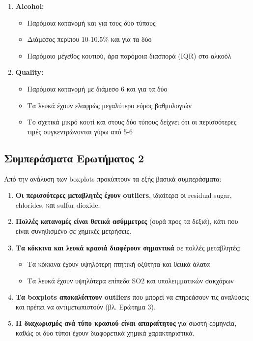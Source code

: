 \documentclass[12pt,a4paper]{article}
\begin{document}
\begin{enumerate}
    \item \textbf{Alcohol:}
    \begin{itemize}
        \item Παρόμοια κατανομή και για τους δύο τύπους
        \item Διάμεσος περίπου 10-10.5\% και για τα δύο
        \item Παρόμοιο μέγεθος κουτιού, άρα παρόμοια διασπορά (IQR) στο αλκοόλ
    \end{itemize}
    
    \item \textbf{Quality:}
    \begin{itemize}
        \item Παρόμοια κατανομή με διάμεσο 6 και για τα δύο
        \item Τα λευκά έχουν ελαφρώς μεγαλύτερο εύρος βαθμολογιών
        \item Το σχετικά μικρό κουτί και στους δύο τύπους δείχνει ότι οι περισσότερες τιμές συγκεντρώνονται γύρω από 5-6
    \end{itemize}
\end{enumerate}

\subsection{Συμπεράσματα Ερωτήματος 2}

Από την ανάλυση των boxplots προκύπτουν τα εξής βασικά συμπεράσματα:

\begin{enumerate}
    \item \textbf{Οι περισσότερες μεταβλητές έχουν outliers}, ιδιαίτερα οι residual sugar, chlorides, και sulfur dioxide.
    
    \item \textbf{Πολλές κατανομές είναι θετικά ασύμμετρες} (ουρά προς τα δεξιά), κάτι που είναι συνηθισμένο σε χημικές μετρήσεις.
    
    \item \textbf{Τα κόκκινα και λευκά κρασιά διαφέρουν σημαντικά} σε πολλές μεταβλητές:
    \begin{itemize}
        \item Τα κόκκινα έχουν υψηλότερη πτητική οξύτητα και θειικά άλατα
        \item Τα λευκά έχουν υψηλότερα επίπεδα SO2 και υπολειμματικών σακχάρων
    \end{itemize}
    
    \item \textbf{Τα boxplots αποκαλύπτουν outliers} που μπορεί να επηρεάσουν τις αναλύσεις και πρέπει να αντιμετωπιστούν (βλ. Ερώτημα 3).
    
    \item \textbf{Η διαχωρισμός ανά τύπο κρασιού είναι απαραίτητος} για σωστή ερμηνεία, καθώς οι δύο τύποι έχουν διαφορετικά χημικά χαρακτηριστικά.
\end{enumerate}
\end{document}
